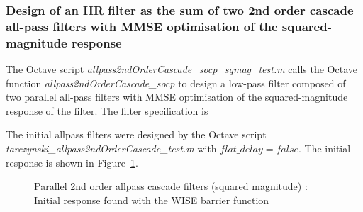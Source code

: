 \documentclass[a4paper,twoside,10pt,english]{report}
\begin{document}
\subsubsection{Design of an IIR filter as the sum of two 2nd order cascade all-pass filters with MMSE optimisation of the squared-magnitude response}
The Octave script 
\emph{allpass2ndOrderCascade\_socp\_sqmag\_test.m} calls the Octave 
function \emph{allpass2ndOrderCascade\_socp} to design a low-pass filter
composed of two parallel all-pass filters with MMSE optimisation of the
squared-magnitude response of the filter. The filter specification is
\begin{small}

\end{small}
The initial allpass filters were designed by the Octave script 
\emph{tarczynski\_allpass2ndOrderCascade\_test.m} with $flat\_delay=false$.
The initial response is shown in 
Figure~\ref{fig:Parallel-2nd-order-cascade-allpass-sqmag-initial-response}.
\begin{figure}[!htbp]
\begin{center}
\scalebox{0.7}{}
\caption{Parallel 2nd order allpass cascade filters (squared magnitude) : Initial response found with the WISE barrier function}
\label{fig:Parallel-2nd-order-cascade-allpass-sqmag-initial-response}
\end{center}
\end{figure}
\end{document}
